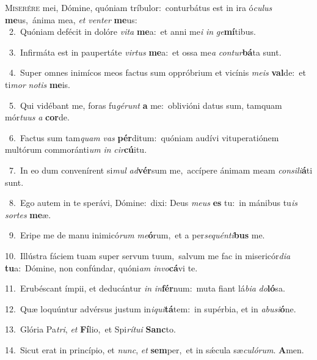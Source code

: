 \lettrine{\initial\textcolor{\initialcolor}{M}}{iserére} mei, Dómine, quóniam tríbulor:~\dagger conturbátus est in ira ó\-\textit{cu}\-\textit{lus} \textbf{me}\-us,~\star ánima mea, \textit{et} \textit{ven}\-\textit{ter} \textbf{me}\-us:\\
{\numbfont\textcolor{\numbcolor}{~2.}}~Quóniam defécit in dolóre \textit{vi}\-\textit{ta} \textbf{me}\-a:~\star et anni me\textit{i} \textit{in} \textit{ge}\-\textbf{mí}tibus.\par
{\numbfont\textcolor{\numbcolor}{~3.}}~Infirmáta est in paupertáte \textit{vir}\-\textit{tus} \textbf{me}\-a:~\star et ossa me\textit{a} \textit{con}\-\textit{tur}\textbf{bá}ta sunt.\par
{\numbfont\textcolor{\numbcolor}{~4.}}~Super omnes inimícos meos factus sum oppróbrium et vicínis \textit{me}\-\textit{is} \textbf{val}\-de:~\star et ti\textit{mor} \textit{no}\-\textit{tis} \textbf{me}\-is.\par
{\numbfont\textcolor{\numbcolor}{~5.}}~Qui vidébant me, foras fu\-\textit{gé}\-\textit{runt} \textbf{a} me:~\star oblivióni datus sum, tamquam mór\-\textit{tu}\-\textit{us} \textit{a} \textbf{cor}\-de.\par
{\numbfont\textcolor{\numbcolor}{~6.}}~Factus sum tam\textit{quam} \textit{vas} \textbf{pér}\-ditum:~\star quóniam audívi vituperatiónem multórum commoránti\textit{um} \textit{in} \textit{cir}\-\textbf{cú}itu.\par
{\numbfont\textcolor{\numbcolor}{~7.}}~In eo dum convenírent si\textit{mul} \textit{ad}\-\textbf{vér}sum me,~\star accípere ánimam meam \textit{con}\-\textit{si}\textit{li}\textbf{á}ti sunt.\par
{\numbfont\textcolor{\numbcolor}{~8.}}~Ego autem in te sperávi, Dómine:~\dagger dixi: Deus \textit{me}\-\textit{us} \textbf{es} tu:~\star in mánibus tu\textit{is} \textit{sor}\-\textit{tes} \textbf{me}\-æ.\par
{\numbfont\textcolor{\numbcolor}{~9.}}~Eripe me de manu inimicó\textit{rum} \textit{me}\-\textbf{ó}rum,~\star et a per\-\textit{se}\-\textit{quén}\textit{ti}\textbf{bus} me.\par
{\numbfont\textcolor{\numbcolor}{10.}}~Illústra fáciem tuam super servum tuum,~\dagger salvum me fac in misericór\-\textit{di}\-\textit{a} \textbf{tu}\-a:~\star Dómine, non confúndar, quóni\textit{am} \textit{in}\-\textit{vo}\textbf{cá}vi te.\par
{\numbfont\textcolor{\numbcolor}{11.}}~Erubéscant ímpii, et deducántur \textit{in} \textit{in}\-\textbf{fér}num:~\star muta fiant lá\-\textit{bi}\-\textit{a} \textit{do}\-\textbf{ló}sa.\par
{\numbfont\textcolor{\numbcolor}{12.}}~Quæ loquúntur advérsus justum in\-\textit{i}\-\textit{qui}\textbf{tá}tem:~\star in supérbia, et in \textit{ab}\-\textit{u}\textit{si}\textbf{ó}ne.\par
{\numbfont\textcolor{\numbcolor}{13.}}~Glória Pa\-\textit{tri}\-, \textit{et} \textbf{Fí}\-lio,~\star et Spi\-\textit{rí}\-\textit{tu}\textit{i} \textbf{Sanc}\-to.\par
{\numbfont\textcolor{\numbcolor}{14.}}~Sicut erat in princípio, et \textit{nunc}\-, \textit{et} \textbf{sem}\-per,~\star et in sǽcula sæ\-\textit{cu}\-\textit{ló}\textit{rum}. \textbf{A}\-men.\par
